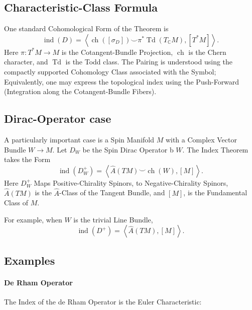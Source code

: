 \documentclass[a4paper, 10pt, onepage]{elegantbook}
\begin{document}
{\subsection{Characteristic-Class Formula}

One standard Cohomological Form of the Theorem is
\begin{equation}
\operatorname{ind}(D)
=
\left\langle
\operatorname{ch}([\sigma_D])\smile
\pi^*\operatorname{Td}(T_{\mathbb C}M),
[T^*M]
\right\rangle.
\end{equation}
Here \(\pi:T^*M\to M\) is the Cotangent-Bundle Projection,
\(\operatorname{ch}\) is the Chern character, and
\(\operatorname{Td}\) is the Todd class. The Pairing is understood using the compactly supported Cohomology Class 
associated with the Symbol; Equivalently, one may express the topological index using the Push-Forward (Integration 
along the Cotangent-Bundle Fibers).

\subsection{Dirac-Operator case}

A particularly important case is a Spin Manifold \(M\) with a Complex Vector Bundle \(W\to M\). Let \(D_W\) be the Spin 
Dirac Operator b
\(W\). The Index Theorem takes the Form
\begin{equation}
\operatorname{ind}(D_W^+)
=
\left\langle
\widehat{A}(TM)\smile\operatorname{ch}(W),
[M]
\right\rangle.
\end{equation}
Here \(D_W^+\) Maps Positive-Chirality Spinors, to Negative-Chirality Spinors, \(\widehat{A}(TM)\) is the 
\(\widehat{A}\)-Class of the Tangent Bundle, and \([M]\), is the Fundamental Class of \(M\).

For example, when \(W\) is the trivial Line Bundle,
\begin{equation}
\operatorname{ind}(D^+)
=
\left\langle\widehat{A}(TM),[M]\right\rangle.
\end{equation}

\subsection{Examples}

\paragraph{De Rham Operator}

The Index of the de Rham Operator is the Euler Characteristic:

}
\end{document}
